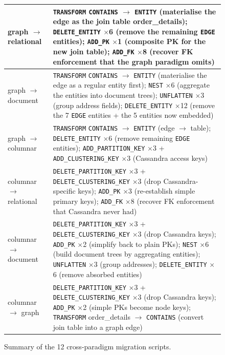 \begin{figure}[htbp]
\begin{tabularx}{\textwidth}{@{}p{3.5cm} X@{}}
graph $\to$ relational
 & \texttt{TRANSFORM} \texttt{CONTAINS} $\to$ \texttt{ENTITY} (materialise the edge as the join table order\_details);
   \texttt{DELETE\_ENTITY} $\times$6 (remove the remaining \texttt{EDGE} entities);
   \texttt{ADD\_PK} $\times$1 (composite PK for the new join table);
   \texttt{ADD\_FK} $\times$8 (recover FK enforcement that the graph paradigm omits) \\
\midrule

graph $\to$ document
 & \texttt{TRANSFORM} \texttt{CONTAINS} $\to$ \texttt{ENTITY} (materialise the edge as a regular entity first);
   \texttt{NEST} $\times$6 (aggregate the entities into document trees);
   \texttt{UNFLATTEN} $\times$3 (group address fields);
   \texttt{DELETE\_ENTITY} $\times$12 (remove the 7 \texttt{EDGE} entities + the 5 entities now embedded) \\
\midrule

graph $\to$ columnar
 & \texttt{TRANSFORM} \texttt{CONTAINS} $\to$ \texttt{ENTITY} (edge $\to$ table);
   \texttt{DELETE\_ENTITY} $\times$6 (remove remaining \texttt{EDGE} entities);
   \texttt{ADD\_PARTITION\_KEY} $\times$3 + \texttt{ADD\_CLUSTERING\_KEY} $\times$3 (Cassandra access keys) \\
\midrule

columnar $\to$ relational
 & \texttt{DELETE\_PARTITION\_KEY} $\times$3 + \texttt{DELETE\_CLUSTERING\_KEY} $\times$3 (drop Cassandra-specific keys);
   \texttt{ADD\_PK} $\times$3 (re-establish simple primary keys);
   \texttt{ADD\_FK} $\times$8 (recover FK enforcement that Cassandra never had) \\
\midrule

columnar $\to$ document
 & \texttt{DELETE\_PARTITION\_KEY} $\times$3 + \texttt{DELETE\_CLUSTERING\_KEY} $\times$3 (drop Cassandra keys);
   \texttt{ADD\_PK} $\times$2 (simplify back to plain PKs);
   \texttt{NEST} $\times$6 (build document trees by aggregating entities);
   \texttt{UNFLATTEN} $\times$3 (group addresses);
   \texttt{DELETE\_ENTITY} $\times$6 (remove absorbed entities) \\
\midrule

columnar $\to$ graph
 & \texttt{DELETE\_PARTITION\_KEY} $\times$3 + \texttt{DELETE\_CLUSTERING\_KEY} $\times$3 (drop Cassandra keys);
   \texttt{ADD\_PK} $\times$2 (simple PKs become node keys);
   \texttt{TRANSFORM} order\_details $\to$ \texttt{CONTAINS} (convert join table into a graph edge) \\
\bottomrule
\end{tabularx}
\caption{Summary of the 12 cross-paradigm migration scripts.}
\label{fig:nw-meta-v2-migration}
\end{figure}


